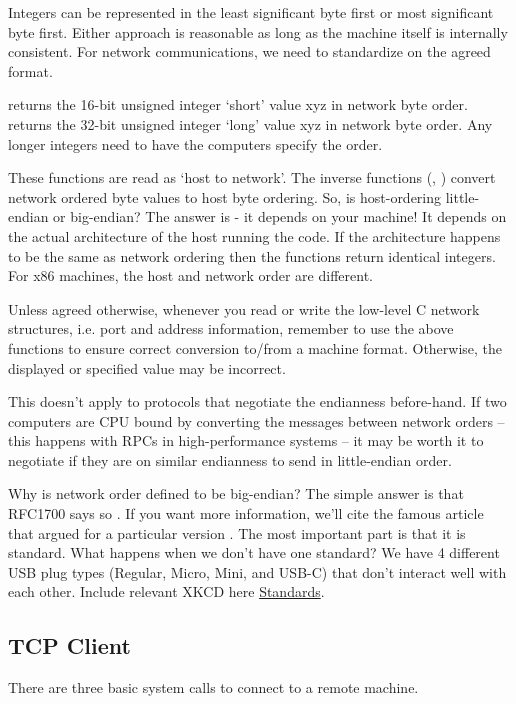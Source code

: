 Integers can be represented in the least significant byte first or most significant byte first.
Either approach is reasonable as long as the machine itself is internally consistent.
For network communications, we need to standardize on the agreed format.

 returns the 16-bit unsigned integer `short' value xyz in network byte order.
 returns the 32-bit unsigned integer `long' value xyz in network byte order.
Any longer integers need to have the computers specify the order.

These functions are read as `host to network'.
The inverse functions (, ) convert network ordered byte values to host byte ordering.
So, is host-ordering little-endian or big-endian?
The answer is - it depends on your machine!
It depends on the actual architecture of the host running the code.
If the architecture happens to be the same as network ordering then the functions return identical integers.
For x86 machines, the host and network order are different.

Unless agreed otherwise, whenever you read or write the low-level C network structures, i.e. port and address information, remember to use the above functions to ensure correct conversion to/from a machine format.
Otherwise, the displayed or specified value may be incorrect.

This doesn't apply to protocols that negotiate the endianness before-hand.
If two computers are CPU bound by converting the messages between network orders -- this happens with RPCs in high-performance systems -- it may be worth it to negotiate if they are on similar endianness to send in little-endian order.

Why is network order defined to be big-endian?
The simple answer is that RFC1700 says so \cite{RFC1700}.
If you want more information, we'll cite the famous article that argued for a particular version \cite{cohen_1980}.
The most important part is that it is standard.
What happens when we don't have one standard?
We have 4 different USB plug types (Regular, Micro, Mini, and USB-C) that don't interact well with each other.
Include relevant XKCD here \href{https://xkcd.com/927/}{Standards}.

\subsection{TCP Client}

There are three basic system calls to connect to a remote machine.

